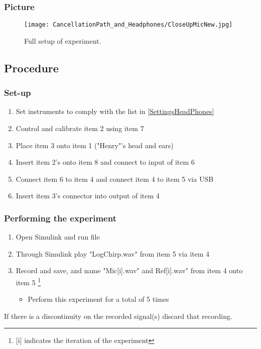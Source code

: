 \subsubsection{Picture}
\begin{figure}[H]
	\centering
	\texttt{[image: CancellationPath\_and\_Headphones/CloseUpMicNew.jpg]}
	\caption{Full setup of experiment.}
	\label{CloseupCancellationPath}
\end{figure}


\subsection{Procedure}
\subsubsection{Set-up}
\begin{enumerate}
	\item Set instruments to comply with the list in \ref{SettingsHeadPhones}
	\item Control and calibrate item 2 using item 7
	\item Place item 3 onto item 1 ("Henry"'s head and ears)
	\item Insert item 2's onto item 8 and connect to input of item 6
	\item Connect item 6 to item 4 and connect item 4 to item 5 via USB
	\item Insert item 3's connector into output of item 4
\end{enumerate}

\subsubsection{Performing the experiment}
\begin{enumerate}
	\item Open Simulink \textsuperscript{\textregistered} and run file  
	\item Through Simulink\textsuperscript{\textregistered} play "LogChirp.wav" from item 5 via item 4
	\item Record and save, and name "Mic[i].wav" and Ref[i].wav" from item 4 onto item 5 \footnote{[i] indicates the iteration of the experiment}
	\begin{itemize}
		\item[] Perform this experiment for a total of 5 times
	\end{itemize}
\end{enumerate}
If there is a discontinuity  on the recorded signal(s) discard that recording.

